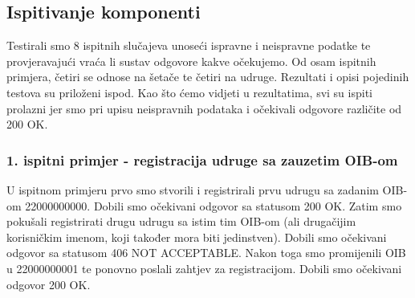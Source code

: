 			
			\subsection{Ispitivanje komponenti}
			Testirali smo 8 ispitnih slučajeva unoseći ispravne i neispravne podatke te provjeravajući vraća li sustav odgovore kakve očekujemo. Od osam ispitnih primjera, četiri se odnose na šetače te četiri na udruge. Rezultati i opisi pojedinih testova su priloženi ispod. Kao što ćemo vidjeti u rezultatima, svi su ispiti prolazni jer smo pri upisu neispravnih podataka i očekivali odgovore različite od 200 OK.
			
			\subsubsection{1. ispitni primjer - registracija udruge sa zauzetim OIB-om}
			
			U ispitnom primjeru prvo smo stvorili i registrirali prvu udrugu sa zadanim OIB-om 22000000000. Dobili smo očekivani odgovor sa statusom 200 OK. Zatim smo pokušali registrirati drugu udrugu sa istim tim OIB-om (ali drugačijim korisničkim imenom, koji također mora biti jedinstven). Dobili smo očekivani odgovor sa statusom 406 NOT ACCEPTABLE. Nakon toga smo promijenili OIB u 22000000001 te ponovno poslali zahtjev za registracijom. Dobili smo očekivani odgovor 200 OK.
			
